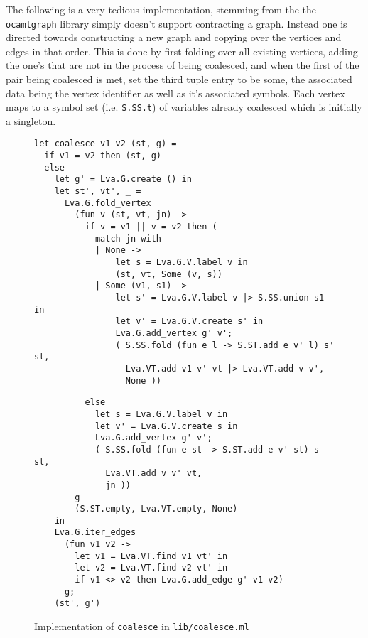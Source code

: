 \documentclass{article}
\begin{document}


The following is a very tedious implementation, stemming from the the \texttt{ocamlgraph} library simply doesn't support contracting a graph. Instead one is directed towards constructing a new graph and copying over the vertices and edges in that order. This is done by first folding over all existing vertices,  adding the one's that are not in the process of being coalesced, and when the first of the pair being coalesced is met, set the third tuple entry to be some, the associated data being the vertex identifier as well as it's associated symbols. Each vertex maps to a symbol set (i.e. \texttt{S.SS.t}) of variables already coalesced which is initially a singleton.


\begin{figure}[H]
  \centering
  \begin{verbatim}
let coalesce v1 v2 (st, g) =
  if v1 = v2 then (st, g)
  else
    let g' = Lva.G.create () in
    let st', vt', _ =
      Lva.G.fold_vertex
        (fun v (st, vt, jn) ->
          if v = v1 || v = v2 then (
            match jn with
            | None ->
                let s = Lva.G.V.label v in
                (st, vt, Some (v, s))
            | Some (v1, s1) ->
                let s' = Lva.G.V.label v |> S.SS.union s1 in
                let v' = Lva.G.V.create s' in
                Lva.G.add_vertex g' v';
                ( S.SS.fold (fun e l -> S.ST.add e v' l) s' st,
                  Lva.VT.add v1 v' vt |> Lva.VT.add v v',
                  None ))
  \end{verbatim}
\end{figure}
\begin{figure}[H]
  \centering
  \begin{verbatim}
          else
            let s = Lva.G.V.label v in
            let v' = Lva.G.V.create s in
            Lva.G.add_vertex g' v';
            ( S.SS.fold (fun e st -> S.ST.add e v' st) s st,
              Lva.VT.add v v' vt,
              jn ))
        g
        (S.ST.empty, Lva.VT.empty, None)
    in
    Lva.G.iter_edges
      (fun v1 v2 ->
        let v1 = Lva.VT.find v1 vt' in
        let v2 = Lva.VT.find v2 vt' in
        if v1 <> v2 then Lva.G.add_edge g' v1 v2)
      g;
    (st', g')
  \end{verbatim}
  \caption{Implementation of \texttt{coalesce} in \texttt{lib/coalesce.ml}}\label{fig:coalesce.ml}
\end{figure}
\end{document}

